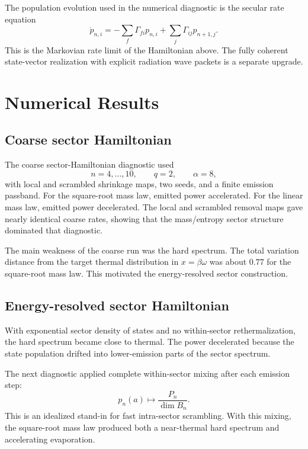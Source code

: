 \documentclass[aps,prd,onecolumn,longbibliography,nofootinbib]{revtex4-2}
\begin{document}
The population evolution used in the numerical diagnostic is the secular
rate equation
\begin{equation}
    \dot p_{n,i}
    =
    -\sum_{f}\Gamma_{fi}p_{n,i}
    +
    \sum_{j}\Gamma_{ij}p_{n+1,j}.
\end{equation}
This is the Markovian rate limit of the Hamiltonian above.  The fully coherent
state-vector realization with explicit radiation wave packets is a separate
upgrade.

\section{Numerical Results}
\label{sec:results}

\subsection{Coarse sector Hamiltonian}

The coarse sector-Hamiltonian diagnostic used
\begin{equation}
    n=4,\ldots,10,\qquad q=2,\qquad \alpha=8,
\end{equation}
with local and scrambled shrinkage maps, two seeds, and a finite emission
passband.  For the square-root mass law, emitted power accelerated.  For the
linear mass law, emitted power decelerated.  The local and scrambled removal
maps gave nearly identical coarse rates, showing that the mass/entropy sector
structure dominated that diagnostic.

The main weakness of the coarse run was the hard spectrum.  The total variation
distance from the target thermal distribution in $x=\beta\omega$ was about
$0.77$ for the square-root mass law.  This motivated the energy-resolved sector
construction.

\subsection{Energy-resolved sector Hamiltonian}

With exponential sector density of states and no within-sector
rethermalization, the hard spectrum became close to thermal.  The power
decelerated because the state population drifted into lower-emission parts of
the sector spectrum.

The next diagnostic applied complete within-sector mixing after each emission
step:
\begin{equation}
    p_n(a)\mapsto \frac{P_n}{\dim B_n}.
\end{equation}
This is an idealized stand-in for fast intra-sector scrambling.  With this
mixing, the square-root mass law produced both a near-thermal hard spectrum and
accelerating evaporation.
\end{document}
